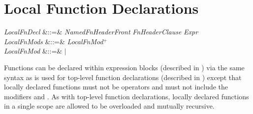 \section{Local Function Declarations}
\begin{Grammar}
\emph{LocalFnDecl} &::=&
\emph{NamedFnHeaderFront} \emph{FnHeaderClause} \EXP{=}
\emph{Expr} \\

\emph{LocalFnMods} &::=& \emph{LocalFnMod}$^+$\\

\emph{LocalFnMod} &::=&  $|$ \\
\end{Grammar}


Functions can be declared within expression blocks (described in
) via the same syntax as is used for top-level
function declarations (described in )
except that locally declared functions must not be operators
and must not include the modifiers  and .
As with top-level function declarations, locally declared functions in a
single scope are allowed to be overloaded and mutually recursive.
